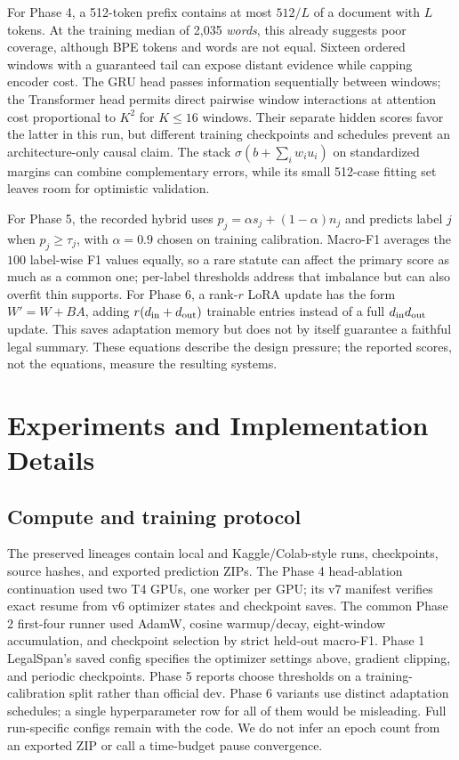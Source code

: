 \documentclass[11pt,oneside]{article}
\begin{document}
For Phase 4, a 512-token prefix contains at most $512/L$ of a document with $L$ tokens. At the training median of 2,035 \emph{words}, this already suggests poor coverage, although BPE tokens and words are not equal. Sixteen ordered windows with a guaranteed tail can expose distant evidence while capping encoder cost. The GRU head passes information sequentially between windows; the Transformer head permits direct pairwise window interactions at attention cost proportional to $K^2$ for $K\leq16$ windows. Their separate hidden scores favor the latter in this run, but different training checkpoints and schedules prevent an architecture-only causal claim. The stack $\sigma(b+\sum_iw_iu_i)$ on standardized margins can combine complementary errors, while its small 512-case fitting set leaves room for optimistic validation.

For Phase 5, the recorded hybrid uses $p_j=\alpha s_j+(1-\alpha)n_j$ and predicts label $j$ when $p_j\geq\tau_j$, with $\alpha=0.9$ chosen on training calibration. Macro-F1 averages the $100$ label-wise F1 values equally, so a rare statute can affect the primary score as much as a common one; per-label thresholds address that imbalance but can also overfit thin supports. For Phase 6, a rank-$r$ LoRA update has the form $W'=W+BA$, adding $r(d_{\rm in}+d_{\rm out})$ trainable entries instead of a full $d_{\rm in}d_{\rm out}$ update. This saves adaptation memory but does not by itself guarantee a faithful legal summary. These equations describe the design pressure; the reported scores, not the equations, measure the resulting systems.

\section{Experiments and Implementation Details}
\subsection{Compute and training protocol}
The preserved lineages contain local and Kaggle/Colab-style runs, checkpoints, source hashes, and exported prediction ZIPs. The Phase 4 head-ablation continuation used two T4 GPUs, one worker per GPU; its v7 manifest verifies exact resume from v6 optimizer states and checkpoint saves. The common Phase 2 first-four runner used AdamW, cosine warmup/decay, eight-window accumulation, and checkpoint selection by strict held-out macro-F1. Phase 1 LegalSpan's saved config specifies the optimizer settings above, gradient clipping, and periodic checkpoints. Phase 5 reports choose thresholds on a training-calibration split rather than official dev. Phase 6 variants use distinct adaptation schedules; a single hyperparameter row for all of them would be misleading. Full run-specific configs remain with the code. We do not infer an epoch count from an exported ZIP or call a time-budget pause convergence.
\end{document}
